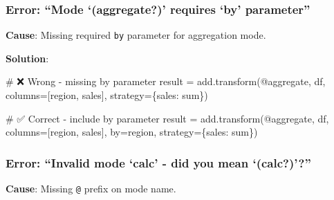 \documentclass[
  letterpaper,
]{scrbook}
\newenvironment{Shaded}{\begin{snugshade}}{\end{snugshade}}
\newcommand{\CommentTok}[1]{\textcolor[rgb]{0.37,0.37,0.37}{#1}}
\newcommand{\NormalTok}[1]{\textcolor[rgb]{0.00,0.23,0.31}{#1}}
\newcommand{\OperatorTok}[1]{\textcolor[rgb]{0.37,0.37,0.37}{#1}}
\newcommand{\StringTok}[1]{\textcolor[rgb]{0.13,0.47,0.30}{#1}}
\begin{document}
\subsubsection{\texorpdfstring{Error: ``Mode `(\textbf{aggregate?})'
requires `by'
parameter''}{Error: ``Mode `(aggregate?)' requires `by' parameter''}}\label{error-mode-aggregate-requires-by-parameter}

\textbf{Cause}: Missing required \texttt{by} parameter for aggregation
mode.

\textbf{Solution}:

\begin{Shaded}
\begin{Highlighting}[]
\CommentTok{\# ❌ Wrong {-} missing by parameter}
\NormalTok{result }\OperatorTok{=}\NormalTok{ add.transform(}\StringTok{\textquotesingle{}@aggregate\textquotesingle{}}\NormalTok{, df, columns}\OperatorTok{=}\NormalTok{[}\StringTok{\textquotesingle{}region\textquotesingle{}}\NormalTok{, }\StringTok{\textquotesingle{}sales\textquotesingle{}}\NormalTok{], }
\NormalTok{                       strategy}\OperatorTok{=}\NormalTok{\{}\StringTok{\textquotesingle{}sales\textquotesingle{}}\NormalTok{: }\StringTok{\textquotesingle{}sum\textquotesingle{}}\NormalTok{\})}

\CommentTok{\# ✅ Correct {-} include by parameter}
\NormalTok{result }\OperatorTok{=}\NormalTok{ add.transform(}\StringTok{\textquotesingle{}@aggregate\textquotesingle{}}\NormalTok{, df, columns}\OperatorTok{=}\NormalTok{[}\StringTok{\textquotesingle{}region\textquotesingle{}}\NormalTok{, }\StringTok{\textquotesingle{}sales\textquotesingle{}}\NormalTok{], }
\NormalTok{                       by}\OperatorTok{=}\StringTok{\textquotesingle{}region\textquotesingle{}}\NormalTok{, strategy}\OperatorTok{=}\NormalTok{\{}\StringTok{\textquotesingle{}sales\textquotesingle{}}\NormalTok{: }\StringTok{\textquotesingle{}sum\textquotesingle{}}\NormalTok{\})}
\end{Highlighting}
\end{Shaded}

\subsubsection{\texorpdfstring{Error: ``Invalid mode `calc' - did you
mean
`(\textbf{calc?})'?''}{Error: ``Invalid mode `calc' - did you mean `(calc?)'?''}}\label{error-invalid-mode-calc---did-you-mean-calc}

\textbf{Cause}: Missing \texttt{@} prefix on mode name.
\end{document}
